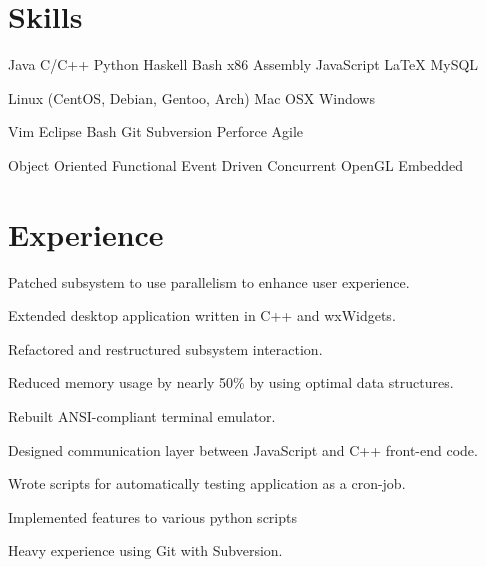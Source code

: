 \documentclass[letterpaper]{deedy-resume} %
\begin{document}
\begin{minipage}[t]{0.66\textwidth} %

%

\section{Skills}
Java \textbullet{} C/C++ \textbullet{} Python \textbullet{} Haskell \textbullet{} Bash \textbullet{} x86 Assembly \textbullet{} JavaScript \textbullet{} \LaTeX \textbullet{} MySQL
    
Linux (CentOS, Debian, Gentoo, Arch) \textbullet{} Mac OSX \textbullet{} Windows

Vim \textbullet{} Eclipse \textbullet{} Bash \textbullet{} Git \textbullet{} Subversion \textbullet{} Perforce \textbullet{} Agile

Object Oriented \textbullet{} Functional \textbullet{} Event Driven
\textbullet{} Concurrent \textbullet{} OpenGL \textbullet{} Embedded

\section{Experience}
\vspace{\topsep} %
\vspace{\topsep} %
\begin{tightitemize}
\item Patched subsystem to use parallelism to enhance user experience.
\item Extended desktop application written in C++ and wxWidgets.
\item Refactored and restructured subsystem interaction.
\item Reduced memory usage by nearly 50\% by using optimal data structures.
\item Rebuilt ANSI-compliant terminal emulator.
\item Designed communication layer between JavaScript and C++ front-end code.
\item Wrote scripts for automatically testing application as a cron-job.
\item Implemented features to various python scripts
\item Heavy experience using Git with Subversion.
\end{tightitemize}


\end{minipage}
\end{document}
